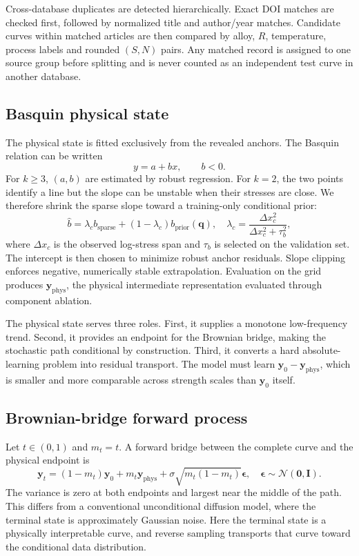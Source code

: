 \documentclass[a4paper,fleqn]{cas-dc}
\newcommand{\vect}[1]{\boldsymbol{#1}}
\begin{document}
Cross-database duplicates are detected hierarchically. Exact DOI matches are checked first, followed by normalized title and author/year matches. Candidate curves within matched articles are then compared by alloy, $R$, temperature, process labels and rounded $(S,N)$ pairs. Any matched record is assigned to one source group before splitting and is never counted as an independent test curve in another database.

\subsection{Basquin physical state}

The physical state is fitted exclusively from the revealed anchors. The Basquin relation can be written
\begin{equation}
 y=a+bx,\qquad b<0.
 \label{eq:basquin_v2}
\end{equation}
For $k\geq3$, $(a,b)$ are estimated by robust regression. For $k=2$, the two points identify a line but the slope can be unstable when their stresses are close. We therefore shrink the sparse slope toward a training-only conditional prior:
\begin{equation}
 \hat b=\lambda_c b_{\mathrm{sparse}}+(1-\lambda_c)b_{\mathrm{prior}}(\vect{q}),
 \quad
 \lambda_c=\frac{\Delta x_c^2}{\Delta x_c^2+\tau_b^2},
 \label{eq:slope_shrink}
\end{equation}
where $\Delta x_c$ is the observed log-stress span and $\tau_b$ is selected on the validation set. The intercept is then chosen to minimize robust anchor residuals. Slope clipping enforces negative, numerically stable extrapolation. Evaluation on the grid produces $\vect{y}_{\mathrm{phys}}$, the physical intermediate representation evaluated through component ablation.

The physical state serves three roles. First, it supplies a monotone low-frequency trend. Second, it provides an endpoint for the Brownian bridge, making the stochastic path conditional by construction. Third, it converts a hard absolute-learning problem into residual transport. The model must learn $\vect{y}_0-\vect{y}_{\mathrm{phys}}$, which is smaller and more comparable across strength scales than $\vect{y}_0$ itself.

\subsection{Brownian-bridge forward process}

Let $t\in(0,1)$ and $m_t=t$. A forward bridge between the complete curve and the physical endpoint is
\begin{equation}
 \vect{y}_t=(1-m_t)\vect{y}_0+m_t\vect{y}_{\mathrm{phys}}
 +\sigma\sqrt{m_t(1-m_t)}\vect{\epsilon},
 \quad \vect{\epsilon}\sim\mathcal{N}(\vect{0},\vect{I}).
 \label{eq:bridge_v2}
\end{equation}
The variance is zero at both endpoints and largest near the middle of the path. This differs from a conventional unconditional diffusion model, where the terminal state is approximately Gaussian noise. Here the terminal state is a physically interpretable curve, and reverse sampling transports that curve toward the conditional data distribution.
\end{document}
